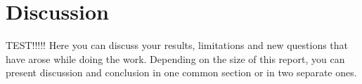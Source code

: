 \section{Discussion}
\label{section:disc}
TEST!!!!! Here you can discuss your results, limitations and new questions that have arose while doing the work. Depending on the size of this report, you can present discussion and conclusion in one common section or in two separate ones. 
